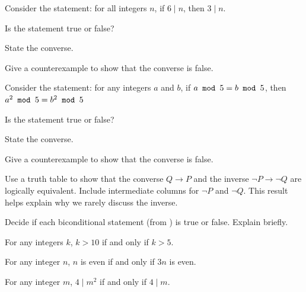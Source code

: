 \begin{exer}[\exerP] %
\label{exer_converse_TorF_divides}
    Consider the statement: for all integers $n$, if $6 \mid n$, then $3 \mid n$.
        \begin{exerpart}
            \item Is the statement true or false?
            \item State the converse.
            \item Give a counterexample to show that the converse is false.
        \end{exerpart}
\end{exer}

\begin{exer}[\exerP] %
\label{exer_converse_TorF_mod}
    Consider the statement: for any integers $a$ and $b$, if $a \texttt{ mod } 5 = b \texttt{ mod } 5$, then $a^2 \texttt{ mod } 5 = b^2 \texttt{ mod } 5$
        \begin{exerpart}
            \item Is the statement true or false?
            \item State the converse.
            \item Give a counterexample to show that the converse is false.
        \end{exerpart}
\end{exer}

\begin{exer}[\exerP] %
\label{exer_converse_inverse_equiv}
    Use a truth table to show that the converse $Q \to P$ and the inverse $\neg P \to \neg Q$ are logically equivalent.  Include intermediate columns for $\neg P$ and $\neg Q$.  This result helps explain why we rarely discuss the inverse.
\end{exer}

\begin{exer}[\exerP] %
\label{exer_TorF_iff}   
    Decide if each biconditional statement (from ) is true or false.  Explain briefly.
        \begin{exerpart}
            \item For any integers $k$, $k>10$ if and only if $k>5$.
            \item For any integer $n$, $n$ is even if and only if $3n$ is even.
            \item For any integer $m$, $4 \mid m^2$ if and only if $4 \mid m$.
        \end{exerpart}
\end{exer}


